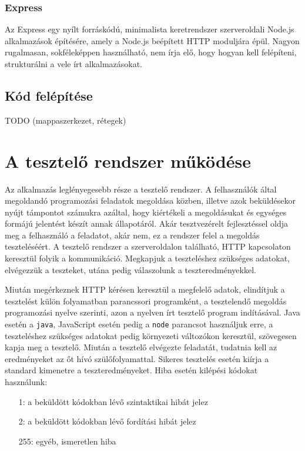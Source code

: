\documentclass{elteikthesis}
\begin{document}
				\subsubsection{Express}
					Az Express \cite{express} egy nyílt forráskódú, minimalista keretrendszer szerveroldali Node.js alkalmazások építésére, amely a Node.js beépített HTTP moduljára épül. Nagyon rugalmasan, sokféleképpen használható, nem írja elő, hogy hogyan kell felépíteni, strukturálni a vele írt alkalmazásokat.
			
			\subsection{Kód felépítése}
			TODO (mappaszerkezet, rétegek)

		\section{A tesztelő rendszer működése}
			Az alkalmazás leglényegesebb része a tesztelő rendszer. A felhasználók által megoldandó programozási feladatok megoldása közben, illetve azok beküldésekor nyújt támpontot számukra azáltal, hogy kiértékeli a megoldásukat és egységes formájú jelentést készít annak állapotáról. Akár tesztvezérelt fejlesztéssel oldja meg a felhasználó a feladatot, akár nem, ez a rendszer felel a megoldás teszteléséért. A tesztelő rendszer a szerveroldalon található, HTTP kapcsolaton keresztül folyik a kommunikáció. Megkapjuk a teszteléshez szükséges adatokat, elvégezzük a teszteket, utána pedig válaszolunk a teszteredményekkel.
			
			Miután megérkeznek HTTP kérésen keresztül a megfelelő adatok, elindítjuk a tesztelést külön folyamatban parancssori programként, a tesztelendő megoldás programozási nyelve szerinti, azon a nyelven írt tesztelő program indításával. Java esetén a \texttt{java}, JavaScript esetén pedig a \texttt{node} parancsot használjuk erre, a teszteléshez szükséges adatokat pedig környezeti változókon keresztül, szövegesen kapja meg a tesztelő. Miután a tesztelő elvégezte feladatát, tudatnia kell az eredményeket az őt hívó szülőfolyamattal. Sikeres tesztelés esetén kiírja a standard kimenetre a teszteredményeket. Hiba esetén kilépési kódokat használunk:
			\begin{itemize}
				\setlength\itemsep{-0.5em}
				\item[1:] a beküldött kódokban lévő szintaktikai hibát jelez
				\item[2:] a beküldött kódokban lévő fordítási hibát jelez
				\item[255:] egyéb, ismeretlen hiba
			\end{itemize}
\end{document}
